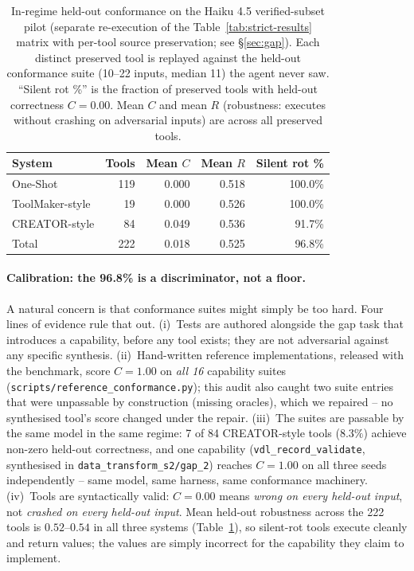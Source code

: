 \documentclass[sigconf,anonymous,review,natbib=false]{acmart}
\begin{document}
\begin{table}[t]
\centering
\small
\caption{In-regime held-out conformance on the Haiku 4.5 verified-subset pilot (separate re-execution of the Table~\ref{tab:strict-results} matrix with per-tool source preservation; see \S\ref{sec:gap}). Each distinct preserved tool is replayed against the held-out conformance suite (10--22 inputs, median 11) the agent never saw. ``Silent rot \%'' is the fraction of preserved tools with held-out correctness $C{=}0.00$. Mean $C$ and mean $R$ (robustness: executes without crashing on adversarial inputs) are across all preserved tools.}
\label{tab:conformance}
\begin{tabular}{lrrrr}
\toprule
\textbf{System} & \textbf{Tools} & \textbf{Mean $C$} & \textbf{Mean $R$} & \textbf{Silent rot \%} \\
\midrule
One-Shot         & 119 & 0.000 & 0.518 & 100.0\% \\
ToolMaker-style  & 19  & 0.000 & 0.526 & 100.0\% \\
CREATOR-style    & 84  & 0.049 & 0.536 & 91.7\% \\
\midrule
Total            & 222 & 0.018 & 0.525 & 96.8\% \\
\bottomrule
\end{tabular}
\end{table}

\paragraph{Calibration: the 96.8\% is a discriminator, not a floor.}
A natural concern is that conformance suites might simply be too hard. Four lines of evidence rule that out. (i)~Tests are authored alongside the gap task that introduces a capability, before any tool exists; they are not adversarial against any specific synthesis. (ii)~Hand-written reference implementations, released with the benchmark, score $C{=}1.00$ on \emph{all 16} capability suites (\texttt{scripts/reference\_conformance.py}); this audit also caught two suite entries that were unpassable by construction (missing oracles), which we repaired -- no synthesised tool's score changed under the repair. (iii)~The suites are passable by the same model in the same regime: 7 of 84 CREATOR-style tools ($8.3\%$) achieve non-zero held-out correctness, and one capability (\texttt{vdl\_record\_validate}, synthesised in \texttt{data\_transform\_s2/gap\_2}) reaches $C{=}1.00$ on all three seeds independently -- same model, same harness, same conformance machinery. (iv)~Tools are syntactically valid: $C{=}0.00$ means \emph{wrong on every held-out input}, not \emph{crashed on every held-out input}. Mean held-out robustness across the 222 tools is $0.52$--$0.54$ in all three systems (Table~\ref{tab:conformance}), so silent-rot tools execute cleanly and return values; the values are simply incorrect for the capability they claim to implement.
\end{document}
